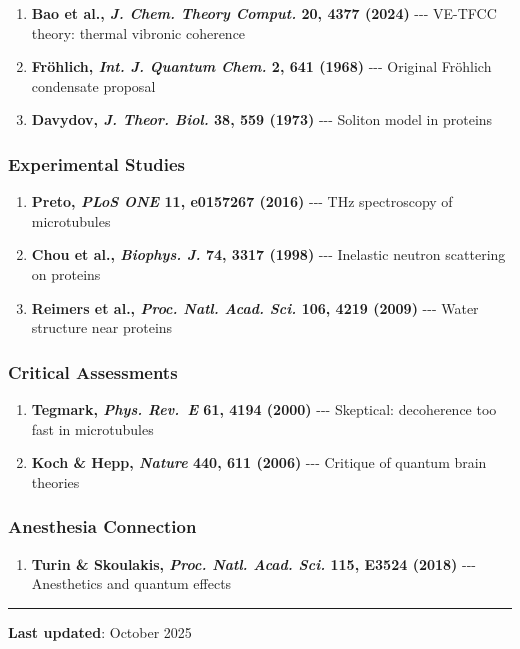 \begin{enumerate}
\def\labelenumi{\arabic{enumi}.}
\tightlist
\item
  \textbf{Bao et al., \emph{J. Chem. Theory Comput.} 20, 4377 (2024)}
  -\/-\/- VE-TFCC theory: thermal vibronic coherence
\item
  \textbf{Fröhlich, \emph{Int. J. Quantum Chem.} 2, 641 (1968)} -\/-\/-
  Original Fröhlich condensate proposal
\item
  \textbf{Davydov, \emph{J. Theor. Biol.} 38, 559 (1973)} -\/-\/-
  Soliton model in proteins
\end{enumerate}

\subsubsection{Experimental Studies}\label{experimental-studies}

\begin{enumerate}
\def\labelenumi{\arabic{enumi}.}
\setcounter{enumi}{3}
\tightlist
\item
  \textbf{Preto, \emph{PLoS ONE} 11, e0157267 (2016)} -\/-\/- THz
  spectroscopy of microtubules
\item
  \textbf{Chou et al., \emph{Biophys. J.} 74, 3317 (1998)} -\/-\/-
  Inelastic neutron scattering on proteins
\item
  \textbf{Reimers et al., \emph{Proc. Natl. Acad. Sci.} 106, 4219
  (2009)} -\/-\/- Water structure near proteins
\end{enumerate}

\subsubsection{Critical Assessments}\label{critical-assessments}

\begin{enumerate}
\def\labelenumi{\arabic{enumi}.}
\setcounter{enumi}{6}
\tightlist
\item
  \textbf{Tegmark, \emph{Phys. Rev.~E} 61, 4194 (2000)} -\/-\/-
  Skeptical: decoherence too fast in microtubules
\item
  \textbf{Koch \& Hepp, \emph{Nature} 440, 611 (2006)} -\/-\/- Critique
  of quantum brain theories
\end{enumerate}

\subsubsection{Anesthesia Connection}\label{anesthesia-connection}

\begin{enumerate}
\def\labelenumi{\arabic{enumi}.}
\setcounter{enumi}{8}
\tightlist
\item
  \textbf{Turin \& Skoulakis, \emph{Proc. Natl. Acad. Sci.} 115, E3524
  (2018)} -\/-\/- Anesthetics and quantum effects
\end{enumerate}

\begin{center}\rule{0.5\linewidth}{0.5pt}\end{center}

\textbf{Last updated}: October 2025
